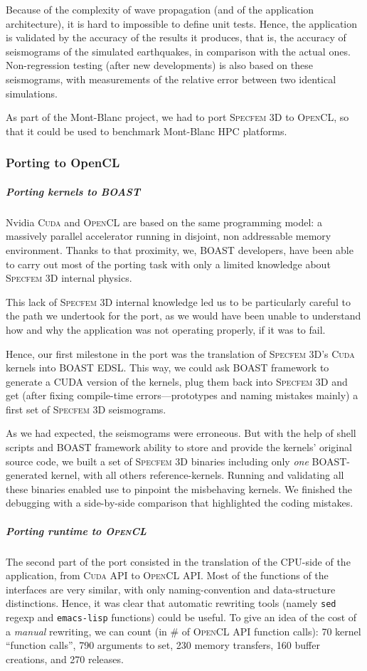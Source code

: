 \documentclass[11pt, a4paper, twoside]{montblanc}
\newcommand{\productname}[1]{\textsc{#1}}
\newcommand{\Specfem}{\productname{Specfem 3D}\xspace}
\newcommand{\Cuda}{\productname{Cuda}\xspace}
\newcommand{\OCL}{\productname{OpenCL}\xspace}
\newcommand{\code}[1]{\texttt{#1}}
\begin{document}
Because of the complexity of wave propagation (and of the application
architecture), it is hard to impossible to define unit tests. Hence,
the application is validated by the accuracy of the results it
produces, that is, the accuracy of seismograms of the simulated
earthquakes, in comparison with the actual ones. Non-regression
testing (after new developments) is also based on these seismograms,
with measurements of the relative error between two identical
simulations.

As part of the Mont-Blanc project, we had to port \Specfem to \OCL, so
that it could be used to benchmark Mont-Blanc HPC platforms.

\subsubsection{Porting to OpenCL}

\subparagraph{Porting kernels to BOAST} 

Nvidia \Cuda and \OCL are based on the same programming model: a
massively parallel accelerator running in disjoint, non addressable
memory environment. Thanks to that proximity, we, BOAST developers,
have been able to carry out most of the porting task with only a
limited knowledge about \Specfem internal physics.

This lack of \Specfem internal knowledge led us to be particularly
careful to the path we undertook for the port, as we would have
been unable to understand how and why the application was not
operating properly, if it was to fail.

Hence, our first milestone in the port was the translation of
\Specfem's \Cuda kernels into BOAST EDSL. This way, we could ask BOAST
framework to generate a CUDA version of the kernels, plug them back
into \Specfem and get (after fixing compile-time errors---prototypes
and naming mistakes mainly) a first set of \Specfem seismograms.

As we had expected, the seismograms were erroneous. But with the help
of shell scripts and BOAST framework ability to store and provide the
kernels' original source code, we built a set of \Specfem binaries
including only \emph{one} BOAST-generated kernel, with all others
reference-kernels. Running and validating all these binaries enabled
use to pinpoint the misbehaving kernels. We finished the debugging
with a side-by-side comparison that highlighted the coding mistakes.

\subparagraph{Porting runtime to \OCL} The second part of the port
consisted in the translation of the CPU-side of the application, from
\Cuda API to \OCL API. Most of the functions of the interfaces are
very similar, with only naming-convention and data-structure
distinctions. Hence, it was clear that automatic rewriting tools
(namely \code{sed} regexp and \code{emacs-lisp} functions) could be
useful. To give an idea of the cost of a \emph{manual} rewriting, we
can count (in \# of \OCL API function calls): 70 kernel ``function
calls'', 790 arguments to set, 230 memory transfers, 160 buffer
creations, and 270 releases.
\end{document}
